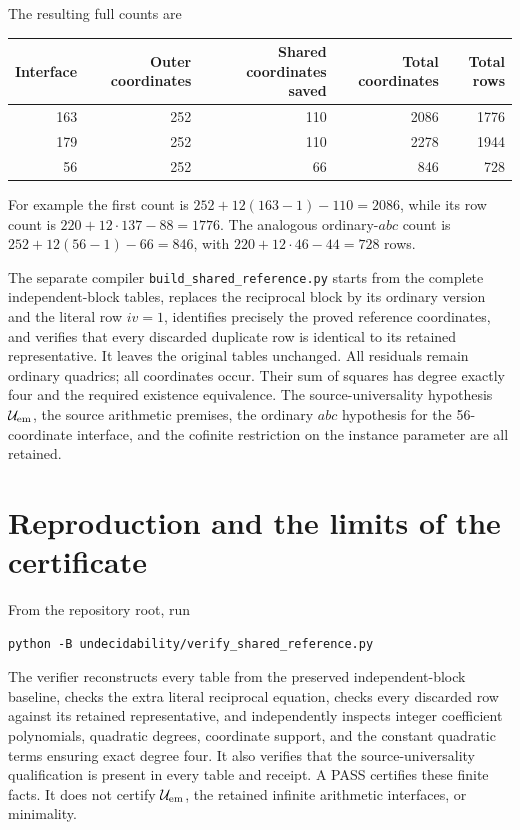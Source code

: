 \documentclass[11pt]{article}
\begin{document}
The resulting full counts are
\begin{center}
\begin{tabular}{rrrrr}
\toprule
Interface&Outer coordinates&Shared coordinates saved&Total coordinates&Total rows\\
\midrule
163&252&110&2086&1776\\
179&252&110&2278&1944\\
56&252&66&846&728\\
\bottomrule
\end{tabular}
\end{center}
For example the first count is \(252+12(163-1)-110=2086\), while its row
count is \(220+12\cdot137-88=1776\). The analogous ordinary-\(abc\) count
is \(252+12(56-1)-66=846\), with \(220+12\cdot46-44=728\) rows.

The separate compiler \texttt{build\_shared\_reference.py} starts from the
complete independent-block tables, replaces the reciprocal block by its
ordinary version and the literal row \(iv=1\), identifies precisely the
proved reference coordinates, and verifies that every discarded duplicate
row is identical to its retained representative. It leaves the original
tables unchanged. All residuals remain ordinary quadrics; all coordinates
occur. Their sum of squares has degree exactly four and the required
existence equivalence. The source-universality hypothesis \(\mathcal U_{\rm em}\), the source arithmetic premises, the ordinary
\(abc\) hypothesis for the 56-coordinate interface, and the cofinite
restriction on the instance parameter are all retained.

\section{Reproduction and the limits of the certificate}
From the repository root, run
\begin{verbatim}
python -B undecidability/verify_shared_reference.py
\end{verbatim}
The verifier reconstructs every table from the preserved independent-block
baseline, checks the extra literal reciprocal equation, checks every
discarded row against its retained representative, and independently
inspects integer coefficient polynomials, quadratic degrees, coordinate
support, and the constant quadratic terms ensuring exact degree four.
It also verifies that the source-universality qualification is present
in every table and receipt. A PASS certifies these finite facts. It does
not certify \(\mathcal U_{\rm em}\), the retained infinite arithmetic
interfaces, or minimality.
\end{document}
